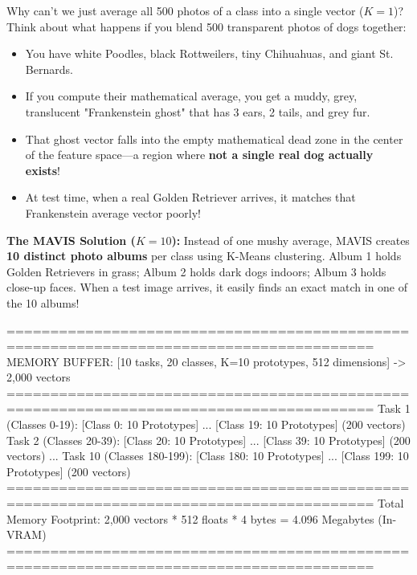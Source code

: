 \documentclass[11pt,a4paper]{article}
\begin{document}
\begin{callout}
Why can't we just average all 500 photos of a class into a single vector ($K=1$)?\newline
Think about what happens if you blend 500 transparent photos of dogs together:
\begin{itemize}[noitemsep]
    \item You have white Poodles, black Rottweilers, tiny Chihuahuas, and giant St. Bernards.
    \item If you compute their mathematical average, you get a muddy, grey, translucent "Frankenstein ghost" that has 3 ears, 2 tails, and grey fur.
    \item That ghost vector falls into the empty mathematical dead zone in the center of the feature space—a region where \textbf{not a single real dog actually exists}!
    \item At test time, when a real Golden Retriever arrives, it matches that Frankenstein average vector poorly!
\end{itemize}
\textbf{The MAVIS Solution ($K=10$):} Instead of one mushy average, MAVIS creates \textbf{10 distinct photo albums} per class using K-Means clustering. Album 1 holds Golden Retrievers in grass; Album 2 holds dark dogs indoors; Album 3 holds close-up faces. When a test image arrives, it easily finds an exact match in one of the 10 albums!
\end{callout}

\begin{diagrambox}
========================================================================================
MEMORY BUFFER: [10 tasks, 20 classes, K=10 prototypes, 512 dimensions] -> 2,000 vectors
========================================================================================
Task 1 (Classes 0-19):   [Class 0: 10 Prototypes] ... [Class 19: 10 Prototypes] (200 vectors)
Task 2 (Classes 20-39):  [Class 20: 10 Prototypes] ... [Class 39: 10 Prototypes] (200 vectors)
...
Task 10 (Classes 180-199): [Class 180: 10 Prototypes] ... [Class 199: 10 Prototypes] (200 vectors)
========================================================================================
Total Memory Footprint: 2,000 vectors * 512 floats * 4 bytes = 4.096 Megabytes (In-VRAM)
========================================================================================
\end{diagrambox}
\end{document}
